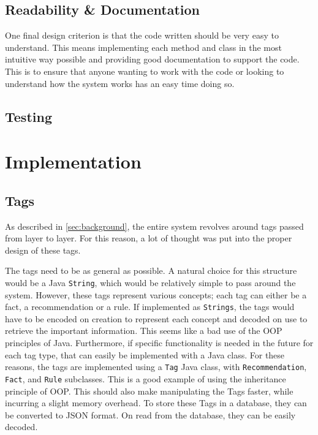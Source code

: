 \documentclass[titlepage,11pt]{article}
\newcommand{\code}[1]{\texttt{#1}}
\begin{document}
\subsection{Readability \& Documentation}

One final design criterion is that the code written should be very easy to understand. This means implementing each method and class in the most intuitive way possible and providing good documentation to support the code. This is to ensure that anyone wanting to work with the code or looking to understand how the system works has an easy time doing so.


\subsection{Testing}

\section{Implementation}
\label{sec:implementation}

\subsection{Tags}

As described in \autoref{sec:background}, the entire system revolves around tags passed from layer to layer. For this reason, a lot of thought was put into the proper design of these tags.

The tags need to be as general as possible. A natural choice for this structure would be a Java \code{String}, which would be relatively simple to pass around the system. However, these tags represent various concepts; each tag can either be a fact, a recommendation or a rule. If implemented as \code{Strings}, the tags would have to be encoded on creation to represent each concept and decoded on use to retrieve the important information. This seems like a bad use of the OOP principles of Java. Furthermore, if specific functionality is needed in the future for each tag type, that can easily be implemented with a Java class. For these reasons, the tags are implemented using a \code{Tag} Java class, with \code{Recommendation}, \code{Fact}, and \code{Rule} subclasses. This is a good example of using the inheritance principle of OOP. This should also make manipulating the Tags faster, while incurring a slight memory overhead. To store these Tags in a database, they can be converted to JSON format. On read from the database, they can be easily decoded.
\end{document}
